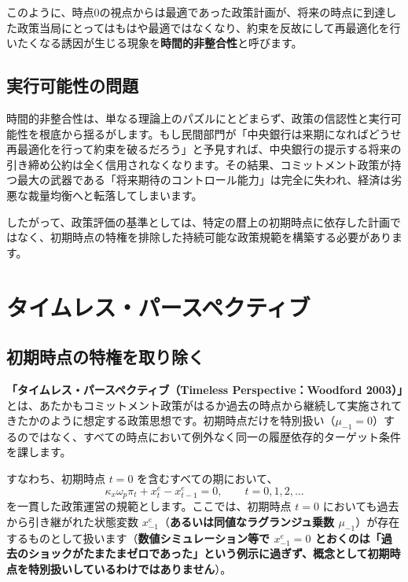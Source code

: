 \documentclass[
  japanese,
  lualatex,
  ja=standard,
  12pt,
  a4paper]{ltjsarticle}
\begin{document}
このように、時点0の視点からは最適であった政策計画が、将来の時点に到達した政策当局にとってはもはや最適ではなくなり、約束を反故にして再最適化を行いたくなる誘因が生じる現象を\textbf{時間的非整合性}と呼びます。

\subsection{実行可能性の問題}\label{ux5b9fux884cux53efux80fdux6027ux306eux554fux984c}

時間的非整合性は、単なる理論上のパズルにとどまらず、政策の信認性と実行可能性を根底から揺るがします。もし民間部門が「中央銀行は来期になればどうせ再最適化を行って約束を破るだろう」と予見すれば、中央銀行の提示する将来の引き締め公約は全く信用されなくなります。その結果、コミットメント政策が持つ最大の武器である「将来期待のコントロール能力」は完全に失われ、経済は劣悪な裁量均衡へと転落してしまいます。

したがって、政策評価の基準としては、特定の暦上の初期時点に依存した計画ではなく、初期時点の特権を排除した持続可能な政策規範を構築する必要があります。

\section{タイムレス・パースペクティブ}\label{ux30bfux30a4ux30e0ux30ecux30b9ux30d1ux30fcux30b9ux30daux30afux30c6ux30a3ux30d6}

\subsection{初期時点の特権を取り除く}\label{ux521dux671fux6642ux70b9ux306eux7279ux6a29ux3092ux53d6ux308aux9664ux304f}

\textbf{「タイムレス・パースペクティブ（Timeless Perspective：Woodford
2003）」}とは、あたかもコミットメント政策がはるか過去の時点から継続して実施されてきたかのように想定する政策思想です。初期時点だけを特別扱い（\(\mu_{-1}=0\)）するのではなく、すべての時点において例外なく同一の履歴依存的ターゲット条件を課します。

すなわち、初期時点 \(t=0\) を含むすべての期において、 \[
\kappa_x\omega_p\pi_t+x_t^e-x_{t-1}^e=0,
\qquad
t=0,1,2,\ldots
\] を一貫した政策運営の規範とします。ここでは、初期時点 \(t=0\)
においても過去から引き継がれた状態変数
\(x_{-1}^e\)（\textbf{あるいは同値なラグランジュ乗数
\(\mu_{-1}\)}）が存在するものとして扱います（\textbf{数値シミュレーション等で
\(x_{-1}^e=0\)
とおくのは「過去のショックがたまたまゼロであった」という例示に過ぎず、概念として初期時点を特別扱いしているわけではありません}）。
\end{document}
